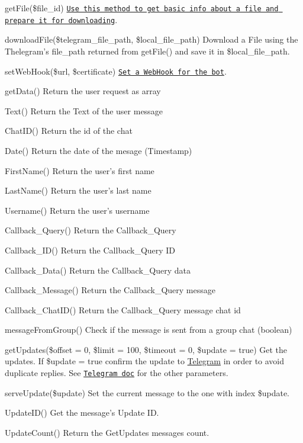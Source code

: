 \begin{DoxyItemize}
\item get\-File(\$file\-\_\-id) \href{https://core.telegram.org/bots/api#getfile}{\tt Use this method to get basic info about a file and prepare it for downloading}.
\item download\-File(\$telegram\-\_\-file\-\_\-path, \$local\-\_\-file\-\_\-path) Download a File using the Thelegram's file\-\_\-path returned from get\-File() and save it in \$local\-\_\-file\-\_\-path.
\item set\-Web\-Hook(\$url, \$certificate) \href{https://core.telegram.org/bots/api#setwebhook}{\tt Set a Web\-Hook for the bot}.
\item get\-Data() Return the user request as array
\item Text() Return the Text of the user message
\item Chat\-I\-D() Return the id of the chat
\item Date() Return the date of the mesage (Timestamp)
\item First\-Name() Return the user's first name
\item Last\-Name() Return the user's last name
\item Username() Return the user's username
\item Callback\-\_\-\-Query() Return the Callback\-\_\-\-Query
\item Callback\-\_\-\-I\-D() Return the Callback\-\_\-\-Query I\-D
\item Callback\-\_\-\-Data() Return the Callback\-\_\-\-Query data
\item Callback\-\_\-\-Message() Return the Callback\-\_\-\-Query message
\item Callback\-\_\-\-Chat\-I\-D() Return the Callback\-\_\-\-Query message chat id
\item message\-From\-Group() Check if the message is sent from a group chat (boolean)
\item get\-Updates(\$offset = 0, \$limit = 100, \$timeout = 0, \$update = true) Get the updates. If \$update = true confirm the update to \hyperlink{class_telegram}{Telegram} in order to avoid duplicate replies. See \href{https://core.telegram.org/bots/api#getting-updates}{\tt Telegram doc} for the other parameters.
\item serve\-Update(\$update) Set the current message to the one with index \$update.
\item Update\-I\-D() Get the message's Update I\-D.
\item Update\-Count() Return the Get\-Updates messages count.
\end{DoxyItemize}

